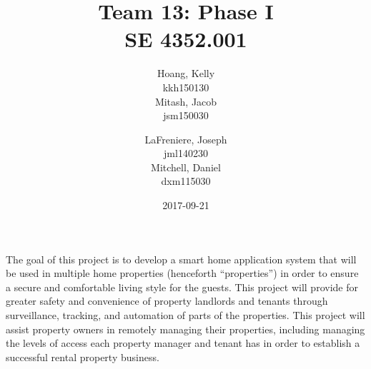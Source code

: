 \documentclass[letter,titlepage,oneside,english]{report}
\title{
  Team 13: Phase I\\
  SE 4352.001
}
\author{%
  Hoang, Kelly\\
  kkh150130\\[3ex]
  Mitash, Jacob\\
  jsm150030
  \and
  LaFreniere, Joseph\\
  jml140230\\[3ex]
  Mitchell, Daniel\\
  dxm115030
}
\date{2017-09-21}
\begin{document}
\maketitle{}

The goal of this project is to develop a smart home application system that will be used in multiple home properties (henceforth \enquote{properties}) in order to ensure a secure and comfortable living style for the guests.
This project will provide for greater safety and convenience of property landlords and tenants through surveillance, tracking, and automation of parts of the properties.
This project will assist property owners in remotely managing their properties, including managing the levels of access each property manager and tenant has in order to establish a successful rental property business.
\end{document}
